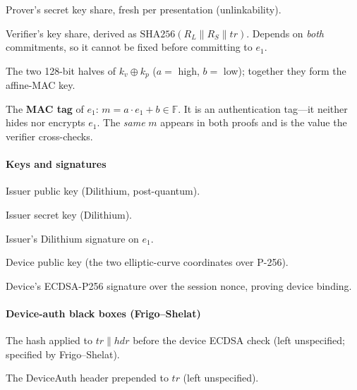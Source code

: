 \documentclass[binding=0.6cm,oneside,noexaminfo]{sapthesis}
\newcommand{\FF}{\mathbb{F}}
\newcommand{\concat}{\mathbin{\|}}
\newcommand{\SHA}{\mathrm{SHA256}}
\begin{document}
\begin{description}[leftmargin=3.5em, labelwidth=3em, style=sameline, itemsep=2pt]
  \item[$k_p$]   Prover's secret key share, fresh per presentation (unlinkability).
  \item[$k_v$]   Verifier's key share, derived as
                 $\SHA(R_L \concat R_S \concat tr)$. Depends on \emph{both}
                 commitments, so it cannot be fixed before committing to $e_1$.
  \item[$a,b$]   The two 128-bit halves of $k_v \oplus k_p$ ($a = $ high,
                 $b = $ low); together they form the affine-MAC key.
  \item[$m$]     The \textbf{MAC tag} of $e_1$: $m = a \cdot e_1 + b \in \FF$.
                 It is an authentication tag---it neither hides nor encrypts
                 $e_1$. The \emph{same} $m$ appears in both proofs and is the
                 value the verifier cross-checks.
\end{description}

\paragraph*{Keys and signatures}

\begin{description}[leftmargin=3.5em, labelwidth=3em, style=sameline, itemsep=2pt]
  \item[$PK_{II}$]         Issuer public key (Dilithium, post-quantum).
  \item[$SK_{II}$]         Issuer secret key (Dilithium).
  \item[$sign$]            Issuer's Dilithium signature on $e_1$.
  \item[$pk_{dx},pk_{dy}$] Device public key (the two elliptic-curve coordinates
                           over P-256).
  \item[$(r_2,s_2)$]       Device's ECDSA-P256 signature over the session nonce,
                           proving device binding.
\end{description}

\paragraph*{Device-auth black boxes (Frigo--Shelat)}

\begin{description}[leftmargin=3.5em, labelwidth=3em, style=sameline, itemsep=2pt]
  \item[$H$]    The hash applied to $tr \concat hdr$ before the device ECDSA
                check (left unspecified; specified by Frigo--Shelat).
  \item[$hdr$]  The DeviceAuth header prepended to $tr$ (left unspecified).
\end{description}
\end{document}
